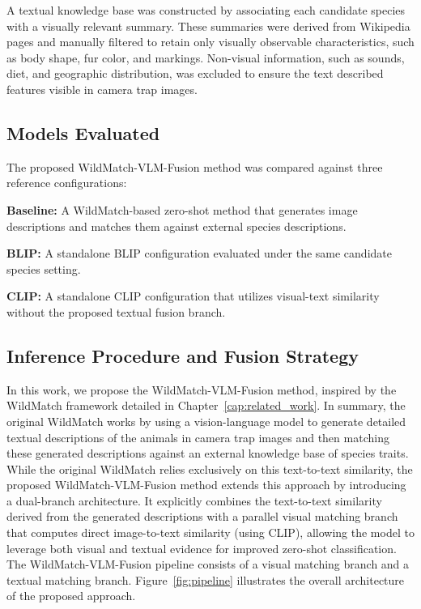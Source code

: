 A textual knowledge base was constructed by associating each candidate species with a visually relevant summary. These summaries were derived from Wikipedia pages and manually filtered to retain only visually observable characteristics, such as body shape, fur color, and markings. Non-visual information, such as sounds, diet, and geographic distribution, was excluded to ensure the text described features visible in camera trap images.

\subsection{Models Evaluated}
The proposed WildMatch-VLM-Fusion method was compared against three reference configurations:

\textbf{Baseline:} A WildMatch-based zero-shot method that generates image descriptions and matches them against external species descriptions.

\textbf{BLIP:} A standalone BLIP configuration evaluated under the same candidate species setting.

\textbf{CLIP:} A standalone CLIP configuration that utilizes visual-text similarity without the proposed textual fusion branch.

\subsection{Inference Procedure and Fusion Strategy}

In this work, we propose the WildMatch-VLM-Fusion method, inspired by the WildMatch framework \cite{fabian2023multimodal} detailed in Chapter~\ref{cap:related_work}. In summary, the original WildMatch works by using a vision-language model to generate detailed textual descriptions of the animals in camera trap images and then matching these generated descriptions against an external knowledge base of species traits. While the original WildMatch relies exclusively on this text-to-text similarity, the proposed WildMatch-VLM-Fusion method extends this approach by introducing a dual-branch architecture. It explicitly combines the text-to-text similarity derived from the generated descriptions with a parallel visual matching branch that computes direct image-to-text similarity (using CLIP), allowing the model to leverage both visual and textual evidence for improved zero-shot classification. The WildMatch-VLM-Fusion pipeline consists of a visual matching branch and a textual matching branch. Figure~\ref{fig:pipeline} illustrates the overall architecture of the proposed approach.

